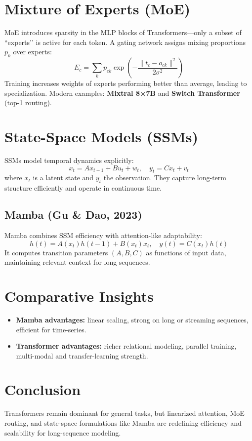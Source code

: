 \documentclass[12pt]{article}
\begin{document}
\section{Mixture of Experts (MoE)}
MoE introduces sparsity in the MLP blocks of Transformers—only a subset of “experts’’ is active for each token.
A gating network assigns mixing proportions $p_k$ over experts:
\[
		E_c = \sum_k p_{ck} \exp\!\left(-\frac{\|t_c - o_{ck}\|^2}{2\sigma^2}\right)
\]
Training increases weights of experts performing better than average, leading to specialization.
Modern examples: \textbf{Mixtral 8×7B} and \textbf{Switch Transformer} (top-1 routing).

\section{State-Space Models (SSMs)}
SSMs model temporal dynamics explicitly:
\[
		x_t = A x_{t-1} + B u_t + w_t, \quad y_t = C x_t + v_t
\]
where $x_t$ is a latent state and $y_t$ the observation.
They capture long-term structure efficiently and operate in continuous time.

\subsection{Mamba (Gu \& Dao, 2023)}
Mamba combines SSM efficiency with attention-like adaptability:
\[
		h(t) = A(x_t)h(t\!-\!1) + B(x_t)x_t, \quad y(t) = C(x_t)h(t)
\]
It computes transition parameters $(A,B,C)$ as functions of input data, maintaining relevant context for long sequences.

\section{Comparative Insights}
\begin{itemize}
		\item \textbf{Mamba advantages:} linear scaling, strong on long or streaming sequences, efficient for time-series.
		\item \textbf{Transformer advantages:} richer relational modeling, parallel training, multi-modal and transfer-learning strength.
\end{itemize}

\section{Conclusion}
Transformers remain dominant for general tasks, but linearized attention, MoE routing, and state-space formulations like Mamba are redefining efficiency and scalability for long-sequence modeling.
\end{document}
